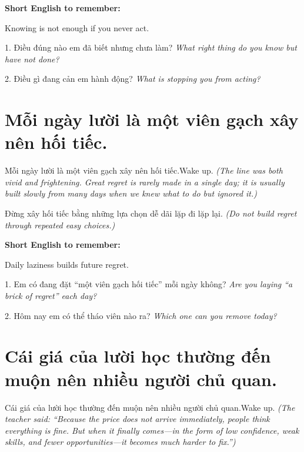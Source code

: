 \begin{ghinhoanh}
\textbf{Short English to remember:}

Knowing is not enough if you never act.

\end{ghinhoanh}

\begin{tuhocnhanh}
1. Điều đúng nào em đã biết nhưng chưa làm? \textit{What right thing do you know but have not done?}

2. Điều gì đang cản em hành động? \textit{What is stopping you from acting?}
\end{tuhocnhanh}
\ngancach

\section{Mỗi ngày lười là một viên gạch xây nên hối tiếc.}
\begin{truyen}{Mỗi ngày lười là một viên gạch xây nên hối tiếc.}{Wake up.}
\textit{(The line was both vivid and frightening. Great regret is rarely made in a single day; it is usually built slowly from many days when we knew what to do but ignored it.)}
\end{truyen}

\begin{baihoc}
Đừng xây hối tiếc bằng những lựa chọn dễ dãi lặp đi lặp lại.
\textit{(Do not build regret through repeated easy choices.)}
\end{baihoc}

\begin{ghinhoanh}
\textbf{Short English to remember:}

Daily laziness builds future regret.

\end{ghinhoanh}

\begin{tuhocnhanh}
1. Em có đang đặt “một viên gạch hối tiếc” mỗi ngày không? \textit{Are you laying “a brick of regret” each day?}

2. Hôm nay em có thể tháo viên nào ra? \textit{Which one can you remove today?}
\end{tuhocnhanh}
\ngancach

\section{Cái giá của lười học thường đến muộn nên nhiều người chủ quan.}
\begin{truyen}{Cái giá của lười học thường đến muộn nên nhiều người chủ quan.}{Wake up.}
\textit{(The teacher said: ``Because the price does not arrive immediately, people think everything is fine. But when it finally comes—in the form of low confidence, weak skills, and fewer opportunities—it becomes much harder to fix.'')}
\end{truyen}

